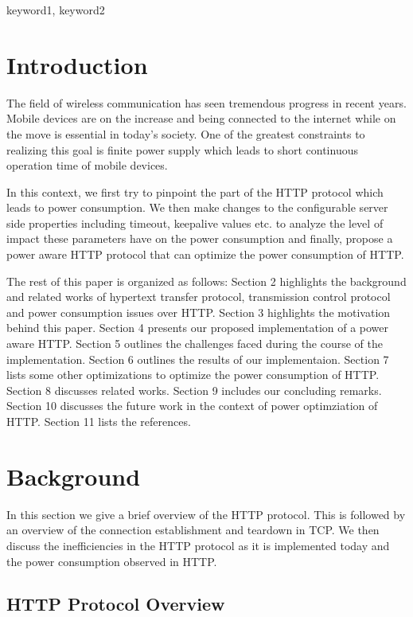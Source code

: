\documentclass{sigplanconf}
\begin{document}
\keywords
keyword1, keyword2

\section{Introduction}

The field of wireless communication has seen tremendous progress in recent years. Mobile devices are on the increase and being connected to the internet while on the move is essential in today’s society. One of the greatest constraints to realizing this goal is finite power supply which leads to short continuous operation time of mobile devices.

In this context, we first try to pinpoint the part of the HTTP protocol which leads to power consumption. We then make changes to the configurable server side properties including timeout, keepalive values etc. to analyze the level of impact these parameters have on the power consumption and finally, propose a power aware HTTP protocol that can optimize the power consumption of HTTP.

The rest of this paper is organized as follows: Section 2 highlights the background and related works of hypertext transfer protocol, transmission control protocol and power consumption issues over HTTP. Section 3 highlights the motivation behind this paper. Section 4 presents our proposed implementation of a power aware HTTP. Section 5 outlines the challenges faced during the course of the implementation. Section 6 outlines the results of our implementaion. Section 7 lists some other optimizations to optimize the power consumption of HTTP. Section 8 discusses related works. Section 9 includes our concluding remarks. Section 10 discusses the future work in the context of power optimziation of HTTP. Section 11 lists the references.

\section{Background}

In this section we give a brief overview of the HTTP protocol. This is followed by an overview of the connection establishment and teardown in TCP. We then discuss the inefficiencies in the HTTP protocol as it is implemented today and the power consumption observed in HTTP.

\subsection{HTTP Protocol Overview}
\end{document}
